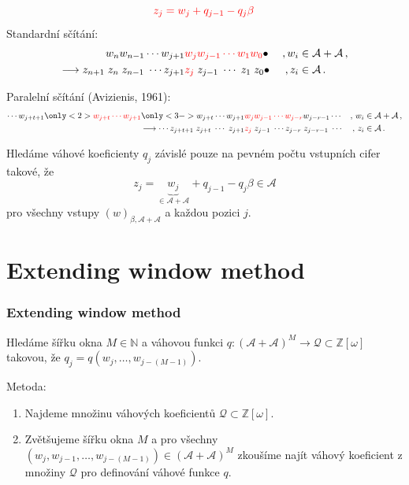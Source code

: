 \documentclass[11pt]{beamer}
\newcommand{\Zomega}{\mathbb{Z}[\omega]}
\newcommand{\NN}{\mathbb{N}}
\newcommand{\A}{\mathcal{A}}
\newcommand{\Q}{\mathcal{Q}}
\begin{document}
\begin{frame}
    $$
        \textcolor{red}{z_j=w_j + q_{j-1} - q_j \beta}\,
    $$
  Standardní sčítání:%
  \begin{align*}
    w_n w_{n-1}\cdots w_{j+1}& \textcolor{red}{w_j w_{j-1} \cdots w_1 w_0}\bullet& \,,w_i &\in \A+\A\,,    \\
    \longrightarrow z_{n+1}\; z_{n}\; z_{n-1}\;\cdots z_{j+1} &\textcolor{red}{z_j} \; z_{j-1}\; \cdots \;z_1 \; z_0\bullet& \,,z_i &\in \A\,.
  \end{align*}
    
  \pause 
   Paralelní sčítání (Avizienis, 1961):
  \begin{align*}
    \cdots w_{j+t+1}\only<2>{\textcolor{red}{w_{j+t} \cdots w_{j+1}}} \only<3->{w_{j+t} \cdots w_{j+1}}& \textcolor{red}{w_j w_{j-1} \cdots w_{j-r}}w_{j-r-1} \cdots &,\, w_i &\in \A + \A\,,    \\
    \longrightarrow \cdots z_{j+t+1}\;z_{j+t} \; \cdots \; z_{j+1} &\textcolor{red}{z_j} \; z_{j-1}\; \cdots z_{j-r}\;z_{j-r-1}\; \cdots &,\, z_i &\in \A\,.
  \end{align*}

    
\end{frame}

\begin{frame}
Hledáme váhové koeficienty $q_j$ závislé pouze na pevném počtu vstupních cifer takové, že 
    $$
        z_j=\underbrace{w_j}_{\in \A +\A} + q_{j-1} - q_j \beta \in \A 
    $$
    pro všechny vstupy $(w)_{\beta,\A+\A}$ a každou pozici $j$.
    
%    
\end{frame}


\section{Extending window method}
\begin{frame}
    \frametitle{Extending window method}
    
    Hledáme šířku okna $M \in \NN$ a váhovou funkci $q:(\A+\A)^{M} \rightarrow \Q \subset \Zomega$ takovou, že $q_j=q(w_j, \dots, w_{j-(M-1)})$.
        
    \pause
    \vspace{20pt}
    Metoda:
    \begin{enumerate}
        \item Najdeme množinu váhových koeficientů $\Q \subset \Zomega$.
        \item Zvětšujeme šířku okna $M$ a pro všechny $(w_j,w_{j-1}, \dots , w_{j-(M-1)}) \in (\A+\A)^{M}$ zkoušíme najít váhový koeficient z množiny $\Q$ pro definování váhové funkce $q$.
    \end{enumerate}
\end{frame}
\end{document}
